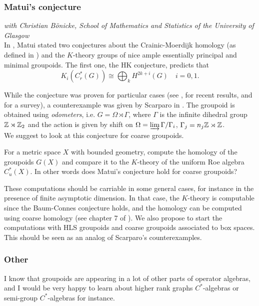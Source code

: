 \subsubsection*{Matui's conjecture}

\textit{with Christian B\"onicke, School of Mathematics and Statistics of the University of Glasgow}\\ 

In \cite{matui2016etale}, Matui stated two conjectures about the Crainic-Moerdijk homology (as defined in \cite{crainic2000homology}) and the $K$-theory groups of nice ample essentially principal and minimal groupoids. The first one, the HK conjecture, predicts that 
\[K_i (C_r^*(G)) \cong \bigoplus_k H^{2k+i}(G)\quad i=0,1.\]

While the conjecture was proven for particular cases (see \cite{ortega2018homology}, \cite{farsi2018ample} for recent results, and  \cite{MatuiSurvey} for a survey), a counterexample was given by Scarparo in \cite{scarparo2018homology}. The groupoid is obtained using \textit{odometers}, i.e. $G=\Omega \rtimes \Gamma$, where $\Gamma$ is the infinite dihedral group $\mathbb{Z}\rtimes \mathbb{Z}_2$ and the action is given by shift on $\Omega=\varinjlim \Gamma/ \Gamma_i$, $\Gamma_j = n_j \mathbb{Z} \rtimes \mathbb{Z}$.\\

We suggest to look at this conjecture for coarse groupoids. 

\begin{project}
For a metric space $X$ with bounded geometry, compute the homology of the groupoids $G(X)$ and compare it to the $K$-theory of the uniform Roe algebra $C^*_u(X)$. In other words does Matui's conjecture hold for coarse groupoids?
\end{project}

These computations should be carriable in some general cases, for instance in the presence of finite asymptotic dimension. In that case, the $K$-theory is computable since the Baum-Connes conjecture holds, and the homology can be computed using coarse homology (see chapter 7 of \cite{NowakYu}). We also propose to start the computations with HLS groupoids and coarse groupoids associated to box spaces. This should be seen as an analog of Scarparo's counterexamples.

\subsubsection*{Other}

I know that groupoids are appearing in a lot of other parts of operator algebras, and I would be very happy to learn about higher rank graphs $C^*$-algebras or semi-group $C^*$-algebras for instance.  


